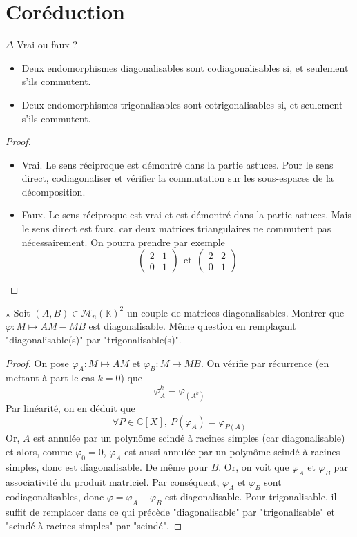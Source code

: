 \documentclass[french,a4paper]{article}
\newcommand{\C}{\mathbb{C}}
\newcommand{\K}{\mathbb{K}}
\theoremstyle{plain}
\theoremstyle{definition}
\theoremstyle{remark}
\begin{document}
\section{Coréduction}

\begin{ex}{$\Delta$}
	Vrai ou faux ?
	\begin{itemize}
		\item Deux endomorphismes diagonalisables sont codiagonalisables si, et seulement s'ils commutent.
		\item Deux endomorphismes trigonalisables sont cotrigonalisables si, et seulement s'ils commutent.
	\end{itemize}
\end{ex}
\begin{proof}
	\begin{itemize}
		\item Vrai. Le sens réciproque est démontré dans la partie astuces. Pour le sens direct, codiagonaliser et vérifier la commutation sur les sous-espaces de la décomposition.
		\item Faux. Le sens réciproque est vrai et est démontré dans la partie astuces. Mais le sens direct est faux, car deux matrices triangulaires ne commutent pas nécessairement. On pourra prendre par exemple $$\begin{pmatrix}
			2&1\\
			0&1
		\end{pmatrix} \ \ \text{et} \ \ \begin{pmatrix}
			2&2\\
			0&1
		\end{pmatrix}$$
	\end{itemize}
\end{proof}

\begin{ex}{$\star$}
	Soit $(A,B)\in\mathcal{M}_n(\K)^2$ un couple de matrices diagonalisables. Montrer que $\varphi :M\mapsto AM-MB$ est diagonalisable. Même question en remplaçant "diagonalisable(s)" par "trigonalisable(s)".
\end{ex}
\begin{proof}
	On pose $\varphi_A:M\mapsto AM$ et $\varphi_B:M\mapsto MB$. On vérifie par récurrence (en mettant à part le cas $k=0$) que $$\varphi_A^k=\varphi_(A^k)$$ Par linéarité, on en déduit que $$\forall P\in\C[X],\ P(\varphi_A)=\varphi_{P(A)}$$ Or, $A$ est annulée par un polynôme scindé à racines simples (car diagonalisable) et alors, comme $\varphi_0=0$, $\varphi_A$ est aussi annulée par un polynôme scindé à racines simples, donc est diagonalisable. De même pour $B$. Or, on voit que $\varphi_A$ et $\varphi_B$ par associativité du produit matriciel. Par conséquent, $\varphi_A$ et $\varphi_B$ sont codiagonalisables, donc $\varphi=\varphi_A-\varphi_B$ est diagonalisable. Pour trigonalisable, il suffit de remplacer dans ce qui précède "diagonalisable" par "trigonalisable" et "scindé à racines simples" par "scindé".
\end{proof}
\end{document}
